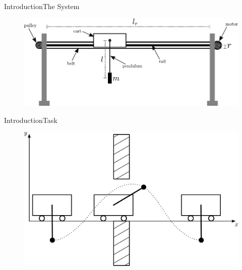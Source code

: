 



\begin{frame}{Introduction}{The System}
  \begin{figure}[H]
    \includegraphics[width=1\textwidth]{figures/systemSetup}
  \end{figure}
\end{frame}

\begin{frame}{Introduction}{Task}
  \begin{figure}[H]
    \includegraphics[width=.85\textwidth]{figures/systemTask}
  \end{figure}
\end{frame}




